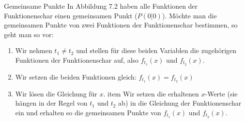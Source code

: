 \begin{bla}{Gemeinsame Punkte}
  In Abbildung 7.2 haben alle Funktionen der Funktionenschar einen gemeinsamen Punkt ($P(0|0)$).
  Möchte man die gemeinsamen Punkte von zwei Funktionen der Funktionenschar bestimmen, so geht man so vor:
  \begin{enumerate}
    \item Wir nehmen $t_1 \neq t_2$ und stellen für diese beiden Variablen die zugehörigen Funktionen der Funktionenschar auf, also $f_{t_1}(x)$ und $f_{t_2}(x)$.
    \item Wir setzen die beiden Funktionen gleich: $f_{t_1}(x)=f_{t_2}(x)$
    \item Wir lösen die Gleichung für $x$.
    item Wir setzen die erhaltenen $x$-Werte (sie hängen in der Regel von $t_1$ und $t_2$ ab) in die Gleichung der Funktionenschar ein und erhalten so die gemeinsamen Punkte von $f_{t_1}(x)$ und $f_{t_2}(x)$. 
  \end{enumerate}
\end{bla}
